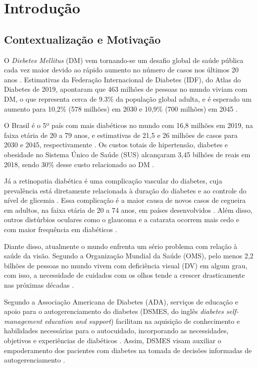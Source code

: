 \chapter{Introdução}
\label{ch:intro}

\section{Contextualização e Motivação}

O \emph{Diebetes Mellitus} (DM) vem tornando-se um desafio global de saúde pública cada vez maior devido ao rápido aumento
no número de casos nos últimos 20 anos \cite{ADA2019}.
Estimativas da Federação Internacional de Diabetes (IDF), do Atlas do Diabetes
de 2019, apontaram que 463 milhões de pessoas no mundo viviam com DM, o que representa cerca de 9.3\% da população
global adulta, e é esperado um aumento para 10,2\% (578 milhões) em 2030 e 10,9\% (700 milhões) em 2045 \cite{SAEEDI2019107843}.

O Brasil é o 5º país com mais diabéticos no mundo com 16,8 milhões em 2019, na faixa etária de 20 a 79 anos, e estimativas
de 21,5 e 26 milhões de casos para 2030 e 2045, respectivamente \cite{SAEEDI2019107843}. Os custos totais de hipertensão, diabetes
e obesidade no Sistema Único de Saúde (SUS) alcançaram 3,45 bilhões de reais em 2018, sendo 30\% desse custo relacionado ao DM \cite{Nilson2020}.

Já a retinopatia diabética é uma complicação vascular do diabetes, cuja prevalência está diretamente relacionada à duração
do diabetes e ao controle do nível de glicemia \cite{Solomon412}. Essa complicação é a maior causa de novos casos de cegueira
em adultos, na faixa etária de 20 a 74 anos, em países desenvolvidos \cite{ADA2019}. Além disso, outros distúrbios oculares
como o glaucoma e a catarata ocorrem mais cedo e com maior frequência em diabéticos \cite{ADA2019}.

Diante disso, atualmente o mundo enfrenta um sério problema com relação à saúde da visão. Segundo a Organização Mundial da Saúde (OMS),
pelo menos 2,2 bilhões de pessoas no mundo vivem com deficiência visual (DV) em algum grau, com isso,
a necessidade de cuidados com os olhos tende a crescer drasticamente nas próximas décadas \cite{WHO2019}.

Segundo a Associação Americana de Diabetes (ADA), serviços de educação e apoio para o autogerenciamento do diabetes
(DSMES, do inglês \emph{diabetes self-management education and support}) facilitam na aquisição de conhecimento e habilidades
necessárias para o autocuidado, incorporando as necessidades, objetivos e experiências de diabéticos \cite{ADA2019}. Assim, DSMES
visam auxiliar o empoderamento dos pacientes com diabetes na tomada de decisões informadas de autogerenciamento \cite{Marrero2013}.

